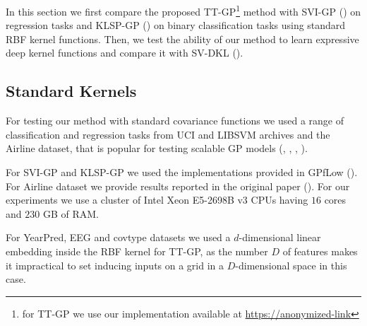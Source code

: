 In this section we first compare the proposed TT-GP\footnote{for TT-GP we use our implementation available at
\url{https://anonymized-link}} method with SVI-GP (\citet{hensman2013}) on regression tasks and KLSP-GP
(\citet{hensman2015}) on binary classification tasks using standard RBF kernel
functions. Then, we test the ability of our method to learn
expressive deep kernel functions and compare it with SV-DKL
(\citet{wilson2016stochastic}).

\subsection{Standard Kernels}

For testing our method with standard covariance functions we used a range of
classification and regression tasks from UCI and LIBSVM archives and the
Airline dataset, that is popular for testing scalable GP models
(\citet{hensman2013}, \citet{hensman2015}, \citet{wilson2016stochastic},
\citet{cutajar2016}).

For SVI-GP and KLSP-GP we used the implementations provided in GPfLow
(\citet{GPflow2016}). For Airline dataset we provide results reported in
the original paper (\citet{hensman2015}). For our experiments we use a cluster of Intel Xeon E5-2698B v3 CPUs having $16$ cores and $230$ GB
of RAM.

For YearPred, EEG and covtype datasets we used a $d$-dimensional linear embedding inside the RBF kernel for TT-GP, as the number $D$ of features makes it
impractical to set inducing inputs on a grid in a $D$-dimensional space in this case.

